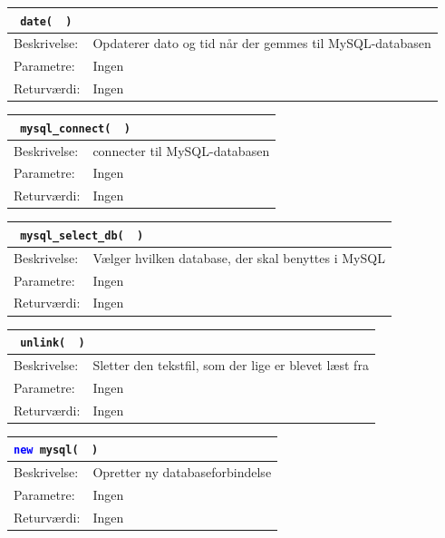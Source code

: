 \begin{table}[H]
\begin{tabular}{l p{12.5cm}}
\multicolumn{2}{l}{\texttt{\textcolor{blue}{} date( \textcolor{blue}{} )}} \\
\hline
Beskrivelse: &Opdaterer dato og tid når der gemmes til MySQL-databasen\\
Parametre: & Ingen\\
Returværdi: & Ingen\\
\end{tabular}
\end{table}

\begin{table}[H]
\begin{tabular}{l p{12.5cm}}
\multicolumn{2}{l}{\texttt{\textcolor{blue}{} mysql\_connect( \textcolor{blue}{} )}} \\
\hline
Beskrivelse: &connecter til MySQL-databasen\\
Parametre: & Ingen\\
Returværdi: & Ingen\\
\end{tabular}
\end{table}

\begin{table}[H]
\begin{tabular}{l p{12.5cm}}
\multicolumn{2}{l}{\texttt{\textcolor{blue}{} mysql\_select\_db( \textcolor{blue}{} )}} \\
\hline
Beskrivelse: & Vælger hvilken database, der skal benyttes i MySQL\\
Parametre: & Ingen\\
Returværdi: & Ingen\\
\end{tabular}
\end{table}

\begin{table}[H]
\begin{tabular}{l p{12.5cm}}
\multicolumn{2}{l}{\texttt{\textcolor{blue}{} unlink( \textcolor{blue}{} )}} \\
\hline
Beskrivelse: & Sletter den tekstfil, som der lige er blevet læst fra\\
Parametre: & Ingen\\
Returværdi: & Ingen\\
\end{tabular}
\end{table}

\begin{table}[H]
\begin{tabular}{l p{12.5cm}}
\multicolumn{2}{l}{\texttt{\textcolor{blue}{new} mysql( \textcolor{blue}{} )}} \\
\hline
Beskrivelse: & Opretter ny databaseforbindelse\\
Parametre: & Ingen\\
Returværdi: & Ingen\\
\end{tabular}
\end{table}

